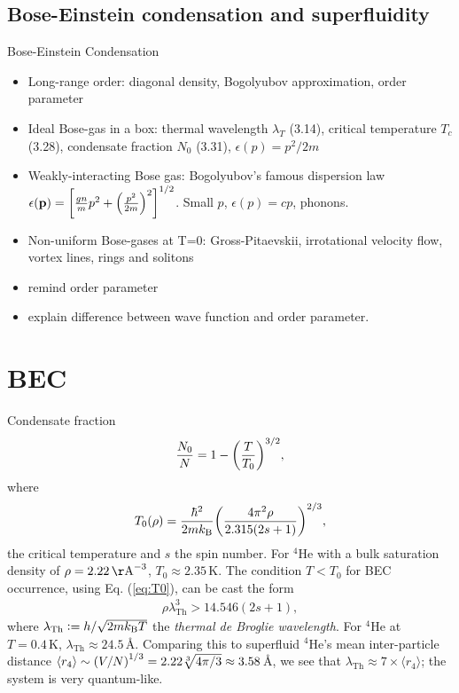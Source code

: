 \documentclass[11pt,a4paper,twoside]{article}
\renewcommand{\vec}[1]{\bm{\mathrm{#1}}}
\begin{document}
	\subsection{Bose-Einstein condensation and superfluidity}		
	Bose-Einstein Condensation
	\begin{itemize}
		\item Long-range order: diagonal density, Bogolyubov approximation, order parameter
		\item Ideal Bose-gas in a box: thermal wavelength $\lambda_T$ (3.14), critical temperature $T_c$ (3.28), condensate fraction $N_0$ (3.31), $\epsilon(p)=p^2/2m$
		\item Weakly-interacting Bose gas: Bogolyubov's famous dispersion law $\epsilon(\vec{p})=\qty[\frac{gn}{m}p^2+\qty(\frac{p^2}{2m})^2]^{1/2}$. Small $p$, $\epsilon(p)=cp$, phonons.
		\item Non-uniform Bose-gases at T=0: Gross-Pitaevskii, irrotational velocity flow, vortex lines, rings and solitons
		\item remind order parameter
		\item explain difference between wave function and order parameter.
	\end{itemize}

	\section{BEC}
		Condensate fraction
		\begin{align}
			\frac{N_0}{N} = 1-\qty(\frac{T}{T_0})^{3/2},
		\end{align}
		where
		\begin{align}
			T_0(\rho) = \frac{\hbar^2}{2mk_\mathrm{B}}\qty(\frac{4\pi^2\rho}{2.315(2s+1)})^{2/3},\label{eq:T0}
		\end{align}
		the critical temperature and $s$ the spin number. For $^4$He with a bulk saturation density of $\rho=2.22\,\mathrm\AA^{-3}$, $T_0\approx 2.35\,\mathrm{K}$. The condition $T<T_0$ for BEC occurrence, using Eq. (\ref{eq:T0}), can be cast the form
		\begin{align}
			\rho\lambda_{\mathrm{Th}}^3>14.546(2s+1),
		\end{align}
		where $\lambda_{\mathrm{Th}} \vcentcolon= h/\sqrt{2mk_\mathrm{B}T}$ the \emph{thermal de Broglie wavelength}. For $^4$He at $T=0.4\,\mathrm{K}$, $\lambda_{\mathrm{Th}}\approx 24.5$\,\AA. Comparing this to superfluid $^4$He's mean inter-particle distance $\langle r_4 \rangle \sim \qty(V/N)^{1/3}=2.22\sqrt[3]{4\pi/3}\approx 3.58$\,\AA, we see that $\lambda_{\mathrm{Th}}\approx 7\times\langle r_4 \rangle $; the system is very quantum-like.
	
\end{document}
